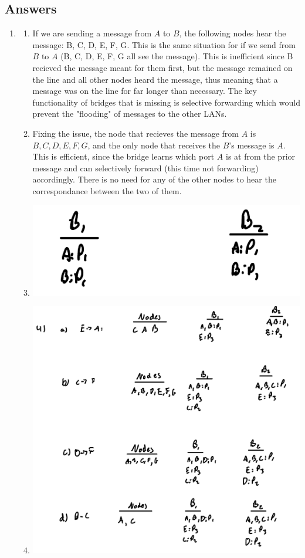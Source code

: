 \documentclass[10pt]{article}
\begin{document}
\newpage

\subsection*{Answers}
    \begin{enumerate}
       \item \begin{enumerate}
        \item If we are sending a message from $A$ to $B$, the following nodes hear the message: B, C, D, E, F, G. This is the same situation for if we send from $B$ to $A$ (B, C, D, E, F, G all see the message). This is inefficient since B recieved the message meant for them first, but the message remained on the line and all other nodes heard the message, thus meaning that a message was on the line for far longer than necessary. The key functionality of bridges that is missing is selective forwarding which would prevent the "flooding" of messages to the other LANs.
        \item Fixing the issue, the node that recieves the message from $A$ is $B, C, D, E, F, G$, and the only node that receives the $B$'s message is $A$. This is efficient, since the bridge learns which port $A$ is at from the prior message and can selectively forward (this time not forwarding) accordingly. There is no need for any of the other nodes to hear the correspondance between the two of them.
        \item \includegraphics[scale = 0.2]{hw2p13.jpeg}
        \item \includegraphics[scale = 0.2]{hw2pr14.jpeg}

\end{enumerate}
\end{enumerate}
\end{document}
